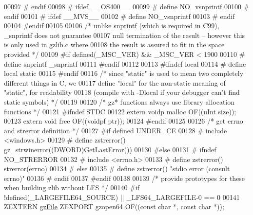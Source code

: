 \begin{DoxyCode}
00097 \textcolor{preprocessor}{#  endif}
00098 \textcolor{preprocessor}{#  ifdef \_\_OS400\_\_}
00099 \textcolor{preprocessor}{#    define NO\_vsnprintf}
00100 \textcolor{preprocessor}{#  endif}
00101 \textcolor{preprocessor}{#  ifdef \_\_MVS\_\_}
00102 \textcolor{preprocessor}{#    define NO\_vsnprintf}
00103 \textcolor{preprocessor}{#  endif}
00104 \textcolor{preprocessor}{#endif}
00105 
00106 \textcolor{comment}{/* unlike snprintf (which is required in C99), \_snprintf does not guarantee}
00107 \textcolor{comment}{   null termination of the result -- however this is only used in gzlib.c where}
00108 \textcolor{comment}{   the result is assured to fit in the space provided */}
00109 \textcolor{preprocessor}{#if defined(\_MSC\_VER) && \_MSC\_VER < 1900}
00110 \textcolor{preprocessor}{#  define snprintf \_snprintf}
00111 \textcolor{preprocessor}{#endif}
00112 
00113 \textcolor{preprocessor}{#ifndef local}
00114 \textcolor{preprocessor}{#  define local static}
00115 \textcolor{preprocessor}{#endif}
00116 \textcolor{comment}{/* since "static" is used to mean two completely different things in C, we}
00117 \textcolor{comment}{   define "local" for the non-static meaning of "static", for readability}
00118 \textcolor{comment}{   (compile with -Dlocal if your debugger can't find static symbols) */}
00119 
00120 \textcolor{comment}{/* gz* functions always use library allocation functions */}
00121 \textcolor{preprocessor}{#ifndef STDC}
00122   \textcolor{keyword}{extern} voidp  malloc OF((uInt size));
00123   \textcolor{keyword}{extern} \textcolor{keywordtype}{void}   free   OF((voidpf ptr));
00124 \textcolor{preprocessor}{#endif}
00125 
00126 \textcolor{comment}{/* get errno and strerror definition */}
00127 \textcolor{preprocessor}{#if defined UNDER\_CE}
00128 \textcolor{preprocessor}{#  include <windows.h>}
00129 \textcolor{preprocessor}{#  define zstrerror() gz\_strwinerror((DWORD)GetLastError())}
00130 \textcolor{preprocessor}{#else}
00131 \textcolor{preprocessor}{#  ifndef NO\_STRERROR}
00132 \textcolor{preprocessor}{#    include <errno.h>}
00133 \textcolor{preprocessor}{#    define zstrerror() strerror(errno)}
00134 \textcolor{preprocessor}{#  else}
00135 \textcolor{preprocessor}{#    define zstrerror() "stdio error (consult errno)"}
00136 \textcolor{preprocessor}{#  endif}
00137 \textcolor{preprocessor}{#endif}
00138 
00139 \textcolor{comment}{/* provide prototypes for these when building zlib without LFS */}
00140 \textcolor{preprocessor}{#if !defined(\_LARGEFILE64\_SOURCE) || \_LFS64\_LARGEFILE-0 == 0}
00141     ZEXTERN \hyperlink{structgz_file__s}{gzFile} ZEXPORT gzopen64 OF((\textcolor{keyword}{const} \textcolor{keywordtype}{char} *, \textcolor{keyword}{const} \textcolor{keywordtype}{char} *));

\end{DoxyCode}
